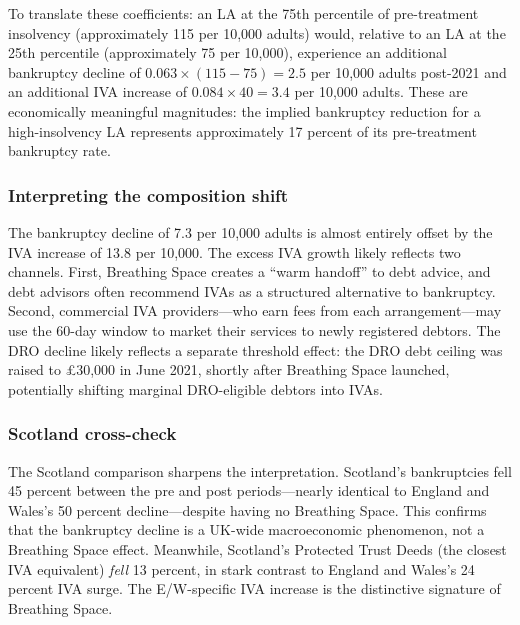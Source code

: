 \documentclass[12pt]{article}
\begin{document}
To translate these coefficients: an LA at the 75th percentile of pre-treatment insolvency (approximately 115 per 10,000 adults) would, relative to an LA at the 25th percentile (approximately 75 per 10,000), experience an additional bankruptcy decline of $0.063 \times (115 - 75) = 2.5$ per 10,000 adults post-2021 and an additional IVA increase of $0.084 \times 40 = 3.4$ per 10,000 adults. These are economically meaningful magnitudes: the implied bankruptcy reduction for a high-insolvency LA represents approximately 17 percent of its pre-treatment bankruptcy rate.

\subsubsection*{Interpreting the composition shift} The bankruptcy decline of 7.3 per 10,000 adults is almost entirely offset by the IVA increase of 13.8 per 10,000. The excess IVA growth likely reflects two channels. First, Breathing Space creates a ``warm handoff'' to debt advice, and debt advisors often recommend IVAs as a structured alternative to bankruptcy. Second, commercial IVA providers---who earn fees from each arrangement---may use the 60-day window to market their services to newly registered debtors. The DRO decline likely reflects a separate threshold effect: the DRO debt ceiling was raised to \pounds30,000 in June 2021, shortly after Breathing Space launched, potentially shifting marginal DRO-eligible debtors into IVAs.

\subsubsection*{Scotland cross-check} The Scotland comparison sharpens the interpretation. Scotland's bankruptcies fell 45 percent between the pre and post periods---nearly identical to England and Wales's 50 percent decline---despite having no Breathing Space. This confirms that the bankruptcy decline is a UK-wide macroeconomic phenomenon, not a Breathing Space effect. Meanwhile, Scotland's Protected Trust Deeds (the closest IVA equivalent) \textit{fell} 13 percent, in stark contrast to England and Wales's 24 percent IVA surge. The E/W-specific IVA increase is the distinctive signature of Breathing Space.


\end{document}
